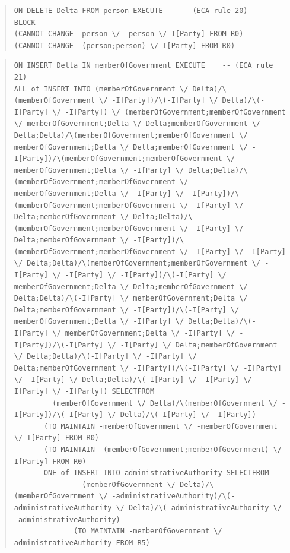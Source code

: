 \documentclass[10pt,a4paper]{report}              %
\theoremstyle{plain}\theorembodyfont{\rmfamily}\newtheorem{definition}{Definition}[section]
\theoremstyle{plain}\theorembodyfont{\rmfamily}\newtheorem{designrule}[definition]{Requirement}
\begin{document}
\begin{quote}
\begin{verbatim}
ON DELETE Delta FROM person EXECUTE    -- (ECA rule 20)
BLOCK
(CANNOT CHANGE -person \/ -person \/ I[Party] FROM R0)
(CANNOT CHANGE -(person;person) \/ I[Party] FROM R0)
\end{verbatim}
\end{quote}
\begin{quote}
\begin{verbatim}
ON INSERT Delta IN memberOfGovernment EXECUTE    -- (ECA rule 21)
ALL of INSERT INTO (memberOfGovernment \/ Delta)/\(memberOfGovernment \/ -I[Party])/\(-I[Party] \/ Delta)/\(-I[Party] \/ -I[Party]) \/ (memberOfGovernment;memberOfGovernment \/ memberOfGovernment;Delta \/ Delta;memberOfGovernment \/ Delta;Delta)/\(memberOfGovernment;memberOfGovernment \/ memberOfGovernment;Delta \/ Delta;memberOfGovernment \/ -I[Party])/\(memberOfGovernment;memberOfGovernment \/ memberOfGovernment;Delta \/ -I[Party] \/ Delta;Delta)/\(memberOfGovernment;memberOfGovernment \/ memberOfGovernment;Delta \/ -I[Party] \/ -I[Party])/\(memberOfGovernment;memberOfGovernment \/ -I[Party] \/ Delta;memberOfGovernment \/ Delta;Delta)/\(memberOfGovernment;memberOfGovernment \/ -I[Party] \/ Delta;memberOfGovernment \/ -I[Party])/\(memberOfGovernment;memberOfGovernment \/ -I[Party] \/ -I[Party] \/ Delta;Delta)/\(memberOfGovernment;memberOfGovernment \/ -I[Party] \/ -I[Party] \/ -I[Party])/\(-I[Party] \/ memberOfGovernment;Delta \/ Delta;memberOfGovernment \/ Delta;Delta)/\(-I[Party] \/ memberOfGovernment;Delta \/ Delta;memberOfGovernment \/ -I[Party])/\(-I[Party] \/ memberOfGovernment;Delta \/ -I[Party] \/ Delta;Delta)/\(-I[Party] \/ memberOfGovernment;Delta \/ -I[Party] \/ -I[Party])/\(-I[Party] \/ -I[Party] \/ Delta;memberOfGovernment \/ Delta;Delta)/\(-I[Party] \/ -I[Party] \/ Delta;memberOfGovernment \/ -I[Party])/\(-I[Party] \/ -I[Party] \/ -I[Party] \/ Delta;Delta)/\(-I[Party] \/ -I[Party] \/ -I[Party] \/ -I[Party]) SELECTFROM
         (memberOfGovernment \/ Delta)/\(memberOfGovernment \/ -I[Party])/\(-I[Party] \/ Delta)/\(-I[Party] \/ -I[Party])
       (TO MAINTAIN -memberOfGovernment \/ -memberOfGovernment \/ I[Party] FROM R0)
       (TO MAINTAIN -(memberOfGovernment;memberOfGovernment) \/ I[Party] FROM R0)
       ONE of INSERT INTO administrativeAuthority SELECTFROM
                (memberOfGovernment \/ Delta)/\(memberOfGovernment \/ -administrativeAuthority)/\(-administrativeAuthority \/ Delta)/\(-administrativeAuthority \/ -administrativeAuthority)
              (TO MAINTAIN -memberOfGovernment \/ administrativeAuthority FROM R5)

\end{verbatim}
\end{quote}
\end{document}
